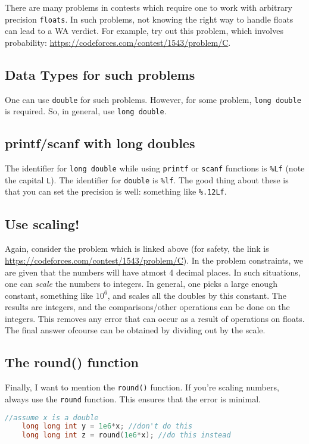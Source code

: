 \documentclass[12pt,a4paper]{amsart}
\numberwithin{equation}{section}
\theoremstyle{definition}
\begin{document}
\noindent There are many problems in contests which require one to work with arbitrary precision \verb|floats|. In such problems, not knowing the right way to handle floats can lead to a WA verdict. For example, try out this problem, which involves probability: \url{https://codeforces.com/contest/1543/problem/C}. 

\subsection{Data Types for such problems} One can use \verb|double| for such problems. However, for some problem, \verb|long double| is required. So, in general, use \verb|long double|. 

\subsection{printf/scanf with long doubles} The identifier for \verb|long double| while using \verb|printf| or \verb|scanf| functions is \verb|%Lf| (note the capital \verb|L|). The identifier for \verb|double| is \verb|%lf|. The good thing about these is that you can set the precision is well: something like \verb|%.12Lf|. 

\subsection{Use scaling!} Again, consider the problem which is linked above (for safety, the link is \url{https://codeforces.com/contest/1543/problem/C}). In the problem constraints, we are given that the numbers will have atmost 4 decimal places. In such situations, one can \textit{scale} the numbers to integers. In general, one picks a large enough constant, something like $10^6$, and scales all the doubles by this constant. The results are integers, and the comparisons/other operations can be done on the integers. This removes any error that can occur as a result of operations on floats. The final answer ofcourse can be obtained by dividing out by the scale. 

\subsection{The round() function} Finally, I want to mention the \verb|round()| function. If you're scaling numbers, always use the \verb|round| function. This ensures that the error is minimal.
\begin{lstlisting}[language=C++]
    //assume x is a double
    long long int y = 1e6*x; //don't do this 
    long long int z = round(1e6*x); //do this instead
\end{lstlisting}
\end{document}
